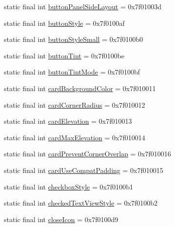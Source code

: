 \begin{CompactItemize}
static final int \hyperlink{classandroid_1_1support_1_1transition_1_1_r_1_1attr_3e93d0ce5973a887ddd1780ee627e213}{buttonPanelSideLayout} = 0x7f01003d
\item 
static final int \hyperlink{classandroid_1_1support_1_1transition_1_1_r_1_1attr_6833dad0167aae7ee0298744a7061c57}{buttonStyle} = 0x7f0100af
\item 
static final int \hyperlink{classandroid_1_1support_1_1transition_1_1_r_1_1attr_202ffc35c063f8a693f6488f0a6696b0}{buttonStyleSmall} = 0x7f0100b0
\item 
static final int \hyperlink{classandroid_1_1support_1_1transition_1_1_r_1_1attr_be9b82695c0eeec235fefe4206e581f1}{buttonTint} = 0x7f0100be
\item 
static final int \hyperlink{classandroid_1_1support_1_1transition_1_1_r_1_1attr_ca14bed9ece5be64514bc43eabd0939f}{buttonTintMode} = 0x7f0100bf
\item 
static final int \hyperlink{classandroid_1_1support_1_1transition_1_1_r_1_1attr_b1477759c92e1b8208c09fb836facbbe}{cardBackgroundColor} = 0x7f010011
\item 
static final int \hyperlink{classandroid_1_1support_1_1transition_1_1_r_1_1attr_ed1a59be4ea3b67c605a6c3562dde793}{cardCornerRadius} = 0x7f010012
\item 
static final int \hyperlink{classandroid_1_1support_1_1transition_1_1_r_1_1attr_867fc59da849cfba7c96f7b4332c2797}{cardElevation} = 0x7f010013
\item 
static final int \hyperlink{classandroid_1_1support_1_1transition_1_1_r_1_1attr_d75df55bd14893cd47cbc5728b5e4332}{cardMaxElevation} = 0x7f010014
\item 
static final int \hyperlink{classandroid_1_1support_1_1transition_1_1_r_1_1attr_f770b16fdcaeaffba748bda13f2d96f6}{cardPreventCornerOverlap} = 0x7f010016
\item 
static final int \hyperlink{classandroid_1_1support_1_1transition_1_1_r_1_1attr_442fa91592d471d104e04cc5da4cf41b}{cardUseCompatPadding} = 0x7f010015
\item 
static final int \hyperlink{classandroid_1_1support_1_1transition_1_1_r_1_1attr_d7ba7efa2091b1c93bdbec085fe27269}{checkboxStyle} = 0x7f0100b1
\item 
static final int \hyperlink{classandroid_1_1support_1_1transition_1_1_r_1_1attr_8643006ab767bbdabead14e05ccd2fe6}{checkedTextViewStyle} = 0x7f0100b2
\item 
static final int \hyperlink{classandroid_1_1support_1_1transition_1_1_r_1_1attr_90c101823e5274a056d0759a86e0b5f6}{closeIcon} = 0x7f0100d9

\end{CompactItemize}
